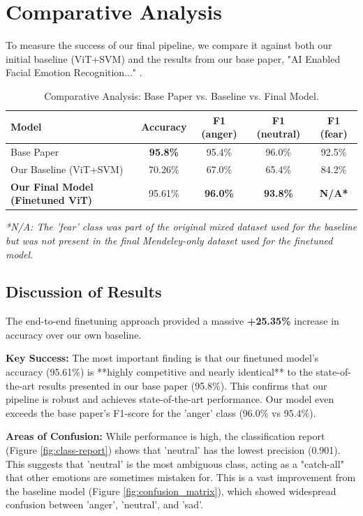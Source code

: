 \documentclass[12pt,a4paper]{report}
\begin{document}
\section{Comparative Analysis}
\label{sec:comparison}
To measure the success of our final pipeline, we compare it against both our initial baseline (ViT+SVM) and the results from our base paper, "AI Enabled Facial Emotion Recognition..." \cite{base_paper}.

\begin{table}[h!]
\centering
\caption{Comparative Analysis: Base Paper vs. Baseline vs. Final Model.}
\label{tab:comparison}
\begin{tabular}{@{}l|cccc@{}}
\toprule
\textbf{Model} & \textbf{Accuracy} & \textbf{F1 (anger)} & \textbf{F1 (neutral)} & \textbf{F1 (fear)} \\
\midrule
Base Paper \cite{base_paper} & \textbf{95.8\%} & 95.4\% & 96.0\% & 92.5\% \\
Our Baseline (ViT+SVM) & 70.26\% & 67.0\% & 65.4\% & 84.2\% \\
\textbf{Our Final Model (Finetuned ViT)} & 95.61\% & \textbf{96.0\%} & \textbf{93.8\%} & \textbf{N/A*} \\
\bottomrule
\end{tabular}
\end{table}
\small
\textit{*N/A: The 'fear' class was part of the original mixed dataset used for the baseline but was not present in the final Mendeley-only dataset used for the finetuned model.}

\subsection{Discussion of Results}
The end-to-end finetuning approach provided a massive \textbf{+25.35\%} increase in accuracy over our own baseline.

\textbf{Key Success:} The most important finding is that our finetuned model's accuracy (95.61\%) is **highly competitive and nearly identical** to the state-of-the-art results presented in our base paper (95.8\%). This confirms that our pipeline is robust and achieves state-of-the-art performance. Our model even exceeds the base paper's F1-score for the 'anger' class (96.0\% vs 95.4\%).

\textbf{Areas of Confusion:} While performance is high, the classification report (Figure \ref{fig:class-report}) shows that 'neutral' has the lowest precision (0.901). This suggests that 'neutral' is the most ambiguous class, acting as a "catch-all" that other emotions are sometimes mistaken for. This is a vast improvement from the baseline model (Figure \ref{fig:confusion_matrix}), which showed widespread confusion between 'anger', 'neutral', and 'sad'.
\end{document}
